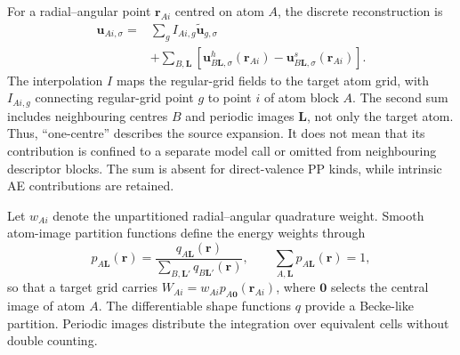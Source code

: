\documentclass[10pt,a4paper,twocolumn]{article}
\newcommand{\uvec}{\boldsymbol{u}}
\begin{document}
For a radial--angular point $\mathbf r_{Ai}$ centred on atom $A$, the discrete reconstruction is
\begin{equation}
 \begin{aligned}
 \uvec_{Ai,\sigma}={}&\sum_g I_{Ai,g}\widetilde{\uvec}_{g,\sigma}\\
 &+\sum_{B,\mathbf L}\left[\uvec^h_{B\mathbf L,\sigma}(\mathbf r_{Ai})
                        -\uvec^s_{B\mathbf L,\sigma}(\mathbf r_{Ai})\right].
 \end{aligned}
 \label{eq:composite}
\end{equation}
The interpolation $I$ maps the regular-grid fields to the target atom grid, with $I_{Ai,g}$ connecting regular-grid point $g$ to point $i$ of atom block $A$. The second sum includes neighbouring centres $B$ and periodic images $\mathbf L$, not only the target atom. Thus, ``one-centre'' describes the source expansion. It does not mean that its contribution is confined to a separate model call or omitted from neighbouring descriptor blocks. The sum is absent for direct-valence PP kinds, while intrinsic AE contributions are retained.

Let $w_{Ai}$ denote the unpartitioned radial--angular quadrature weight. Smooth atom-image partition functions define the energy weights through
\begin{equation}
 p_{A\mathbf L}(\mathbf r)=
 \frac{q_{A\mathbf L}(\mathbf r)}{\sum_{B,\mathbf L'}q_{B\mathbf L'}(\mathbf r)},
 \qquad \sum_{A,\mathbf L}p_{A\mathbf L}(\mathbf r)=1,
 \label{eq:partition}
\end{equation}
so that a target grid carries $W_{Ai}=w_{Ai}p_{A\mathbf0}(\mathbf r_{Ai})$, where $\mathbf0$ selects the central image of atom $A$. The differentiable shape functions $q$ provide a Becke-like partition.\cite{Becke1988} Periodic images distribute the integration over equivalent cells without double counting.
\end{document}
